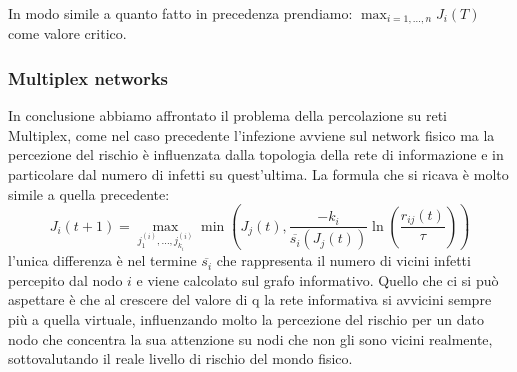 In modo simile a quanto fatto in precedenza prendiamo: $\max_{i= 1,\dots,n}J_{i}(T)$ come valore critico.

\subsubsection{Multiplex networks}\label{subsubsec:multiplex-networks}
In conclusione abbiamo affrontato il problema della percolazione su reti Multiplex, come nel caso precedente 
l'infezione avviene sul network fisico ma la
percezione del rischio è influenzata dalla topologia della rete di informazione e in particolare dal numero di
infetti su quest'ultima.
La formula che si ricava è molto simile a quella precedente:
\begin{equation}
    J_{i}(t+1)=\max_{j^{(i)}_{1},\dots,j^{(i)}_{k_{i}}}\min(J_{j}(t),\frac{-k_{ i}}{\overline{s_{i}}(J_{j}(t))}\ln(\frac{r_{ij}(t)}{\tau}))\label{eq:multiplex}
\end{equation}
l'unica differenza è nel termine $\overline{s_{i}}$ che rappresenta il numero di vicini infetti percepito
dal nodo $i$ e viene calcolato sul grafo informativo.
Quello che ci si può aspettare è che al crescere del valore di q la rete informativa si avvicini sempre più a quella
virtuale, influenzando molto la percezione del rischio per un dato nodo che concentra la sua attenzione su nodi che non
gli sono vicini realmente, sottovalutando il reale livello di rischio del mondo fisico.
